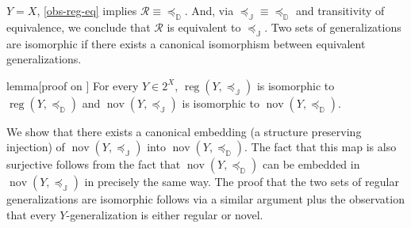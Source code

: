 \documentclass[ecta,nameyear,draft]{econsocart}
\newcommand{\reg}{\operatorname{reg}}
\newcommand{\nov}{\operatorname{nov}}
\newcommand{\mc}{\mathcal}
\newcommand{\preceqb}{\mathbin{\preceq}}
\newcommand{\ext}{\mathrel{\mc R}}
\newcommand{\extb}{\mathbin{\mc R}}
\newcommand{\mbbd}{{\mathds D}}
\newcommand{\mbbj}{\mathds J}
\theoremstyle{plain}
\theoremstyle{remark}
\begin{document}
\begin{appendix}
  $Y=X$, \cref{obs-reg-eq} implies $\extb\equiv \preceqb_{\mbbd}$. And, via
  $\preceqb_{\mbbj}\equiv \preceqb_{\mbbd}$ and transitivity of equivalence, we
  conclude that $\ext$ is equivalent to $\preceq_{\mbbj}$.  Two sets of
  {generalization}s are isomorphic if there exists a canonical isomorphism
  between equivalent {generalization}s. 
  \begin{theoremEnd}{lemma}[proof on
    ] \label{lem-nov-iso} For every $Y \in 2^{X}$,
    $\reg(Y, \preceqb_{\mbbj})$ is isomorphic to $\reg(Y,\preceqb_{\mbbd})$ and
    $\nov ( Y , \preceqb_{\mbbj} )$ is isomorphic to $\nov ( Y , \preceqb _
    \mbbd )$.
  \end{theoremEnd}
  \begin{proofEnd}%
    \label{proof-nov-iso} We show that there exists a canonical embedding (a
    structure preserving injection) of $\nov ( Y , \preceqb _ \mbbj )$ into
    $\nov ( Y , \preceqb _ \mbbd )$. The fact that this map is also surjective
    follows from the fact that $\nov ( Y , \preceqb _ \mbbd )$ can be embedded
    in $\nov ( Y , \preceqb _ \mbbj )$ in precisely the same way. The proof
    that the two sets of regular {generalization}s are isomorphic follows via a
    similar argument plus the observation that every $Y$-{generalization} is
    either regular or novel.


\end{proofEnd}
\end{appendix}
\end{document}
